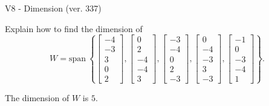 \begin{exercise}
  \begin{exerciseTitle}V8 - Dimension (ver. 337)\end{exerciseTitle}
  \begin{exerciseStatement}
    Explain how to find the dimension of 
\[W=\mathrm{span}\ \left\{\left[\begin{array}{r}
-4 \\
-3 \\
3 \\
0 \\
2
\end{array}\right] , \left[\begin{array}{r}
0 \\
2 \\
-4 \\
-4 \\
3
\end{array}\right] , \left[\begin{array}{r}
-3 \\
-4 \\
0 \\
2 \\
-3
\end{array}\right] , \left[\begin{array}{r}
0 \\
-4 \\
-3 \\
3 \\
-3
\end{array}\right] , \left[\begin{array}{r}
-1 \\
0 \\
-3 \\
-4 \\
1
\end{array}\right]\right\}.\]



  \end{exerciseStatement}
  \begin{exerciseAnswer}
   The dimension of \(W\) is  \(5\).
  


  \end{exerciseAnswer}
\end{exercise}